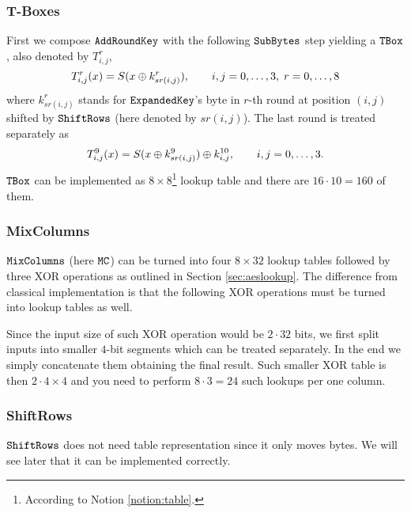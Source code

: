\subsubsection{T-Boxes}
	
	First we compose $\texttt{AddRoundKey}$ with the following $\texttt{SubBytes}$ step yielding a $\texttt{TBox}$, also denoted by $T_{i,j}^r$,
	\begin{equation}
		T_{i,j}^r(x) = S(x\oplus k_{sr(i,j)}^r) , \qquad i,j=0 , \ldots , 3,\;r=0 , \ldots , 8
	\end{equation}
	where $k_{sr(i,j)}^r$ stands for $\texttt{ExpandedKey}$'s byte in $r$-th round at position $(i,j)$ shifted by $\texttt{ShiftRows}$ (here denoted by $sr(i,j)$). The last round is treated separately as
	\begin{equation}
		T_{i,j}^{9}(x) = S(x\oplus k_{sr(i,j)}^9) \oplus k_{i,j}^{10} , \qquad i,j=0 , \ldots , 3 .
	\end{equation}
	$\texttt{TBox}$ can be implemented as $8\times 8$\footnote{According to Notion \ref{notion:table}.} lookup table and there are $16\cdot 10 = 160$ of them.

\subsubsection{MixColumns}
	
	$\texttt{MixColumns}$ (here $\texttt{MC}$) can be turned into four $8\times 32$ lookup tables followed by three XOR operations as outlined in Section \ref{sec:aeslookup}. The difference from classical implementation is that the following XOR operations must be turned into lookup tables as well.
	
	Since the input size of such XOR operation would be $2\cdot 32$ bits, we first split inputs into smaller $4$-bit segments which can be treated separately. In the end we simply concatenate them obtaining the final result. Such smaller XOR table is then $2\cdot 4\times 4$ and you need to perform $8\cdot 3=24$ such lookups per one column.

\subsubsection{ShiftRows}
	
	$\texttt{ShiftRows}$ does not need table representation since it only moves bytes. We will see later that it can be implemented correctly.



